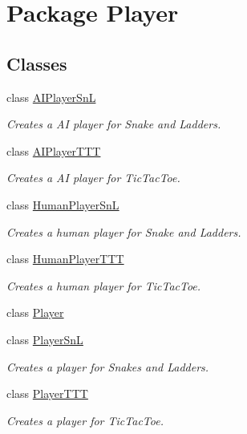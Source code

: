 \hypertarget{namespace_player}{}\section{Package Player}
\label{namespace_player}
\subsection*{Classes}
\begin{DoxyCompactItemize}
\item 
class \hyperlink{class_player_1_1_a_i_player_sn_l}{A\+I\+Player\+Sn\+L}
\begin{DoxyCompactList}\small\item\em Creates a A\+I player for Snake and Ladders. \end{DoxyCompactList}\item 
class \hyperlink{class_player_1_1_a_i_player_t_t_t}{A\+I\+Player\+T\+T\+T}
\begin{DoxyCompactList}\small\item\em Creates a A\+I player for Tic\+Tac\+Toe. \end{DoxyCompactList}\item 
class \hyperlink{class_player_1_1_human_player_sn_l}{Human\+Player\+Sn\+L}
\begin{DoxyCompactList}\small\item\em Creates a human player for Snake and Ladders. \end{DoxyCompactList}\item 
class \hyperlink{class_player_1_1_human_player_t_t_t}{Human\+Player\+T\+T\+T}
\begin{DoxyCompactList}\small\item\em Creates a human player for Tic\+Tac\+Toe. \end{DoxyCompactList}\item 
class \hyperlink{class_player_1_1_player}{Player}
\item 
class \hyperlink{class_player_1_1_player_sn_l}{Player\+Sn\+L}
\begin{DoxyCompactList}\small\item\em Creates a player for Snakes and Ladders. \end{DoxyCompactList}\item 
class \hyperlink{class_player_1_1_player_t_t_t}{Player\+T\+T\+T}
\begin{DoxyCompactList}\small\item\em Creates a player for Tic\+Tac\+Toe. \end{DoxyCompactList}\end{DoxyCompactItemize}
